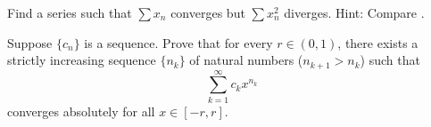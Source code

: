 \begin{exercise}
Find a series such that $\sum x_n$ converges but $\sum x_n^2$ diverges.
Hint: Compare .
\end{exercise}

\begin{exercise}
Suppose $\{ c_n \}$ is a sequence.  Prove that for every $r \in (0,1)$,
there exists a strictly increasing sequence $\{ n_k \}$ of natural numbers ($n_{k+1} > n_k$) such that
\begin{equation*}
\sum_{k=1}^\infty c_k x^{n_k}
\end{equation*}
converges absolutely for all $x \in [-r,r]$.
\end{exercise}


